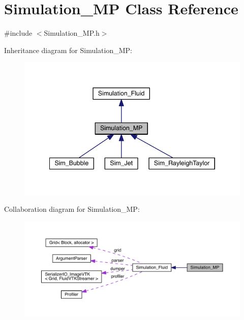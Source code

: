 \hypertarget{class_simulation___m_p}{}\section{Simulation\+\_\+\+M\+P Class Reference}
\label{class_simulation___m_p}


{\ttfamily \#include $<$Simulation\+\_\+\+M\+P.\+h$>$}



Inheritance diagram for Simulation\+\_\+\+M\+P\+:\nopagebreak
\begin{figure}[H]
\begin{center}
\leavevmode
\includegraphics[width=342pt]{d8/db3/class_simulation___m_p__inherit__graph}
\end{center}
\end{figure}


Collaboration diagram for Simulation\+\_\+\+M\+P\+:\nopagebreak
\begin{figure}[H]
\begin{center}
\leavevmode
\includegraphics[width=350pt]{db/df3/class_simulation___m_p__coll__graph}
\end{center}
\end{figure}
